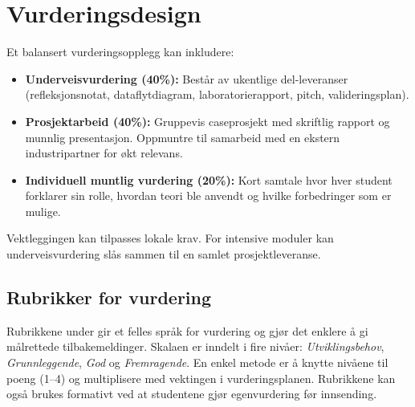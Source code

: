 \section{Vurderingsdesign}
Et balansert vurderingsopplegg kan inkludere:
\begin{itemize}
    \item \textbf{Underveisvurdering (40\%):} Består av ukentlige del-leveranser (refleksjonsnotat, dataflytdiagram, laboratorierapport, pitch, valideringsplan).
    \item \textbf{Prosjektarbeid (40\%):} Gruppevis caseprosjekt med skriftlig rapport og munnlig presentasjon. Oppmuntre til samarbeid med en ekstern industripartner for økt relevans.
    \item \textbf{Individuell muntlig vurdering (20\%):} Kort samtale hvor hver student forklarer sin rolle, hvordan teori ble anvendt og hvilke forbedringer som er mulige.
\end{itemize}
Vektleggingen kan tilpasses lokale krav. For intensive moduler kan underveisvurdering slås sammen til en samlet prosjektleveranse.

\subsection{Rubrikker for vurdering}
Rubrikkene under gir et felles språk for vurdering og gjør det enklere å gi målrettede tilbakemeldinger. Skalaen er inndelt i fire nivåer:
\emph{Utviklingsbehov}, \emph{Grunnleggende}, \emph{God} og \emph{Fremragende}. En enkel metode er å knytte nivåene til poeng (1--4) og multiplisere med vektingen i vurderingsplanen. Rubrikkene kan også brukes formativt ved at studentene gjør egenvurdering før innsending.

